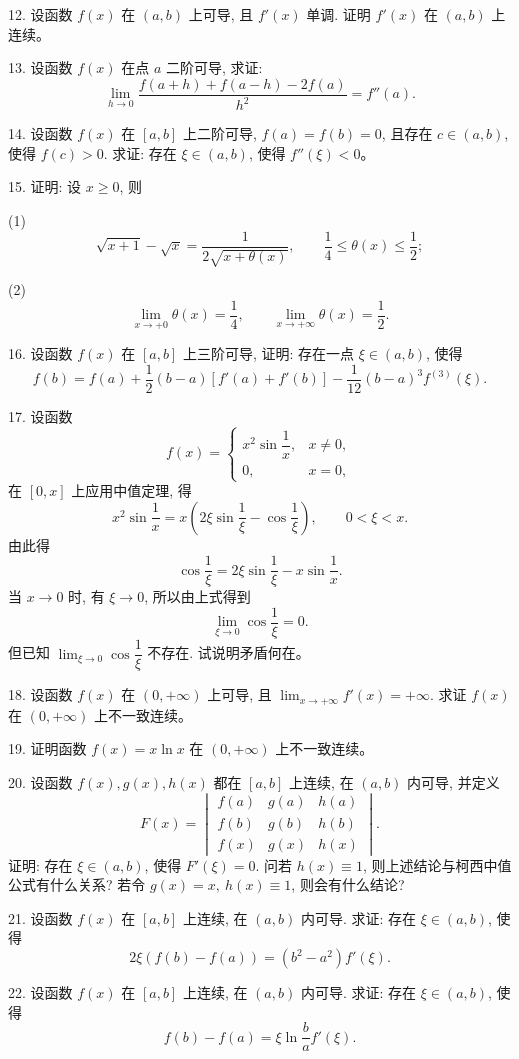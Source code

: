 \documentclass[UTF8, 12pt, fontset=fandol, oneside]{ctexart}
\begin{document}
12. 设函数 $f(x)$ 在 $(a,b)$ 上可导, 且 $f'(x)$ 单调. 证明 $f'(x)$ 在 $(a,b)$ 上连续。

13. 设函数 $f(x)$ 在点 $a$ 二阶可导, 求证:
\[
  \lim_{h\to0}\frac{f(a+h)+f(a-h)-2f(a)}{h^2}=f''(a).
\]

14. 设函数 $f(x)$ 在 $[a,b]$ 上二阶可导, $f(a)=f(b)=0$, 且存在 $c\in(a,b)$, 使得 $f(c)>0$. 求证: 存在 $\xi\in(a,b)$, 使得 $f''(\xi)<0$。

15. 证明: 设 $x\ge0$, 则

(1)
\[
  \sqrt{x+1}-\sqrt x=\frac1{2\sqrt{x+\theta(x)}},\qquad
  \frac14\le\theta(x)\le\frac12;
\]

(2)
\[
  \lim_{x\to+0}\theta(x)=\frac14,\qquad
  \lim_{x\to+\infty}\theta(x)=\frac12.
\]

16. 设函数 $f(x)$ 在 $[a,b]$ 上三阶可导, 证明: 存在一点 $\xi\in(a,b)$, 使得
\[
  f(b)=f(a)+\frac12(b-a)[f'(a)+f'(b)]-\frac1{12}(b-a)^3f^{(3)}(\xi).
\]

17. 设函数
\[
  f(x)=
  \begin{cases}
    x^2\sin\dfrac1x, & x\ne0,\\[4pt]
    0, & x=0,
  \end{cases}
\]
在 $[0,x]$ 上应用中值定理, 得
\[
  x^2\sin\frac1x=x\left(2\xi\sin\frac1\xi-\cos\frac1\xi\right),\qquad 0<\xi<x.
\]
由此得
\[
  \cos\frac1\xi=2\xi\sin\frac1\xi-x\sin\frac1x.
\]
当 $x\to0$ 时, 有 $\xi\to0$, 所以由上式得到
\[
  \lim_{\xi\to0}\cos\frac1\xi=0.
\]
但已知 $\lim_{\xi\to0}\cos\dfrac1\xi$ 不存在. 试说明矛盾何在。

18. 设函数 $f(x)$ 在 $(0,+\infty)$ 上可导, 且 $\lim_{x\to+\infty}f'(x)=+\infty$. 求证 $f(x)$ 在 $(0,+\infty)$ 上不一致连续。

19. 证明函数 $f(x)=x\ln x$ 在 $(0,+\infty)$ 上不一致连续。

20. 设函数 $f(x),g(x),h(x)$ 都在 $[a,b]$ 上连续, 在 $(a,b)$ 内可导, 并定义
\[
  F(x)=
  \begin{vmatrix}
    f(a) & g(a) & h(a)\\
    f(b) & g(b) & h(b)\\
    f(x) & g(x) & h(x)
  \end{vmatrix}.
\]
证明: 存在 $\xi\in(a,b)$, 使得 $F'(\xi)=0$. 问若 $h(x)\equiv1$, 则上述结论与柯西中值公式有什么关系? 若令 $g(x)=x,\ h(x)\equiv1$, 则会有什么结论?

21. 设函数 $f(x)$ 在 $[a,b]$ 上连续, 在 $(a,b)$ 内可导. 求证: 存在 $\xi\in(a,b)$, 使得
\[
  2\xi(f(b)-f(a))=(b^2-a^2)f'(\xi).
\]

22. 设函数 $f(x)$ 在 $[a,b]$ 上连续, 在 $(a,b)$ 内可导. 求证: 存在 $\xi\in(a,b)$, 使得
\[
  f(b)-f(a)=\xi\ln\frac ba f'(\xi).
\]
\end{document}
